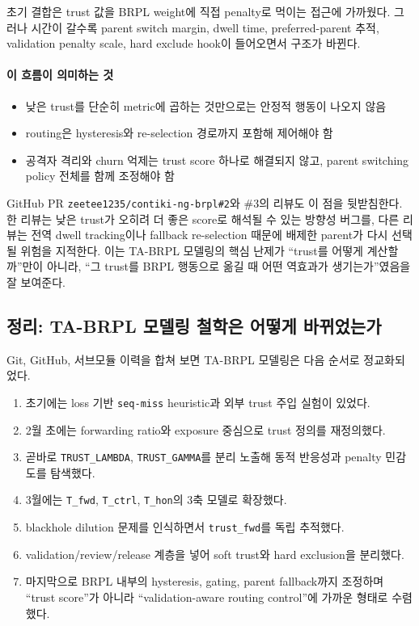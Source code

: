 \documentclass[12pt,a4paper]{article}
\begin{document}
초기 결합은 trust 값을 BRPL weight에 직접 penalty로 먹이는 접근에 가까웠다.
그러나 시간이 갈수록 parent switch margin, dwell time, preferred-parent 추적,
validation penalty scale, hard exclude hook이 들어오면서 구조가 바뀐다.

\paragraph{이 흐름이 의미하는 것}
\begin{itemize}[leftmargin=1.5em]
\item 낮은 trust를 단순히 metric에 곱하는 것만으로는 안정적 행동이 나오지 않음
\item routing은 hysteresis와 re-selection 경로까지 포함해 제어해야 함
\item 공격자 격리와 churn 억제는 trust score 하나로 해결되지 않고,
parent switching policy 전체를 함께 조정해야 함
\end{itemize}

GitHub PR \texttt{zeetee1235/contiki-ng-brpl\#2}와 \#3의 리뷰도 이 점을 뒷받침한다.
한 리뷰는 낮은 trust가 오히려 더 좋은 score로 해석될 수 있는 방향성 버그를,
다른 리뷰는 전역 dwell tracking이나 fallback re-selection 때문에
배제한 parent가 다시 선택될 위험을 지적한다. 이는 TA-BRPL 모델링의 핵심 난제가
``trust를 어떻게 계산할까''만이 아니라, ``그 trust를 BRPL 행동으로 옮길 때
어떤 역효과가 생기는가''였음을 잘 보여준다.

\subsection{정리: TA-BRPL 모델링 철학은 어떻게 바뀌었는가}

Git, GitHub, 서브모듈 이력을 합쳐 보면 TA-BRPL 모델링은 다음 순서로 정교화되었다.

\begin{enumerate}[leftmargin=1.5em]
\item 초기에는 loss 기반 \texttt{seq-miss} heuristic과 외부 trust 주입 실험이 있었다.
\item 2월 초에는 forwarding ratio와 exposure 중심으로 trust 정의를 재정의했다.
\item 곧바로 \texttt{TRUST\_LAMBDA}, \texttt{TRUST\_GAMMA}를 분리 노출해
동적 반응성과 penalty 민감도를 탐색했다.
\item 3월에는 \texttt{T\_fwd}, \texttt{T\_ctrl}, \texttt{T\_hon}의 3축 모델로 확장했다.
\item blackhole dilution 문제를 인식하면서 \texttt{trust\_fwd}를 독립 추적했다.
\item validation/review/release 계층을 넣어 soft trust와 hard exclusion을 분리했다.
\item 마지막으로 BRPL 내부의 hysteresis, gating, parent fallback까지 조정하며
``trust score''가 아니라 ``validation-aware routing control''에 가까운 형태로
수렴했다.
\end{enumerate}
\end{document}
